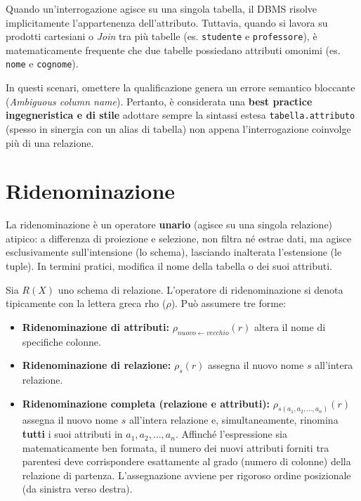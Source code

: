 \begin{observation}
Quando un'interrogazione agisce su una singola tabella, il DBMS risolve implicitamente l'appartenenza dell'attributo. Tuttavia, quando si lavora su prodotti cartesiani o \textit{Join} tra più tabelle (es. \texttt{studente} e \texttt{professore}), è matematicamente frequente che due tabelle possiedano attributi omonimi (es. \texttt{nome} e \texttt{cognome}). 

In questi scenari, omettere la qualificazione genera un errore semantico bloccante (\textit{Ambiguous column name}). Pertanto, è considerata una \textbf{best practice ingegneristica e di stile} adottare sempre la sintassi estesa \texttt{tabella.attributo} (spesso in sinergia con un alias di tabella) non appena l'interrogazione coinvolge più di una relazione.
\end{observation}

\section{Ridenominazione}

La ridenominazione è un operatore \textbf{unario} (agisce su una singola relazione) atipico: a differenza di proiezione e selezione, non filtra né estrae dati, ma agisce esclusivamente sull'intensione (lo schema), lasciando inalterata l'estensione (le tuple). In termini pratici, modifica il nome della tabella o dei suoi attributi.

Sia $R(X)$ uno schema di relazione. L'operatore di ridenominazione si denota tipicamente con la lettera greca rho ($\rho$). Può assumere tre forme:
\begin{itemize}
    \item \textbf{Ridenominazione di attributi:} $\rho_{nuovo \leftarrow vecchio}(r)$ altera il nome di specifiche colonne.
    \item \textbf{Ridenominazione di relazione:} $\rho_{s}(r)$ assegna il nuovo nome $s$ all'intera relazione.
    \item \textbf{Ridenominazione completa (relazione e attributi):} $\rho_{s(a_1, a_2, \dots, a_n)}(r)$ assegna il nuovo nome $s$ all'intera relazione e, simultaneamente, rinomina \textbf{tutti} i suoi attributi in $a_1, a_2, \dots, a_n$. Affinché l'espressione sia matematicamente ben formata, il numero dei nuovi attributi forniti tra parentesi deve corrispondere esattamente al grado (numero di colonne) della relazione di partenza. L'assegnazione avviene per rigoroso ordine posizionale (da sinistra verso destra).
\end{itemize}

